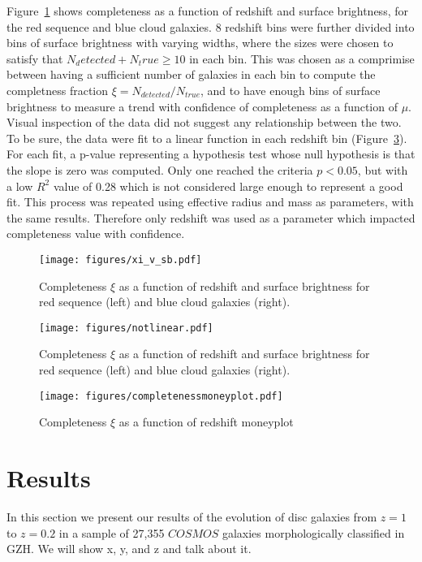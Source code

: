 Figure~\ref{fig:xi_v_sb} shows completeness as a function of redshift and surface brightness, for the red sequence and blue cloud galaxies. 8 redshift bins were further divided into bins of surface brightness with varying widths, where the sizes were chosen to satisfy that $N_detected + N_true \ge 10$ in each bin. This was chosen as a comprimise between having a sufficient number of galaxies in each bin to compute the completness fraction $\xi = N_{detected}/N_{true}$, and to have enough bins of surface brightness to measure a trend with confidence of completeness as a function of $\mu$. Visual inspection of the data did not suggest any relationship between the two. To be sure, the data were fit to a linear function in each redshift bin (Figure~\ref{fig:notlinear}). For each fit, a p-value representing a hypothesis test whose null hypothesis is that the slope is zero was computed. Only one reached the criteria $p<0.05$, but with a low $R^{2}$ value of 0.28 which is not considered large enough to represent a good fit. This process was repeated using effective radius and mass as parameters, with the same results. Therefore only redshift was used as a parameter which impacted completeness value with confidence.  


\begin{figure}
\centering
\texttt{[image: figures/xi\_v\_sb.pdf]}
\caption{Completeness $\xi$ as a function of redshift and surface brightness for red sequence (left) and blue cloud galaxies (right).}
\label{fig:xi_v_sb}
\end{figure}

\begin{figure}
\centering
\texttt{[image: figures/notlinear.pdf]}
\caption{Completeness $\xi$ as a function of redshift and surface brightness for red sequence (left) and blue cloud galaxies (right).}
\label{fig:notlinear}
\end{figure}


\begin{figure}
\centering
\texttt{[image: figures/completenessmoneyplot.pdf]}
\caption{Completeness $\xi$ as a function of redshift moneyplot}
\label{fig:notlinear}
\end{figure}

\section{Results}
\label{sec:results}
In this section we present our results of the evolution of disc galaxies from $z=1$ to $z=0.2$ in a sample of 27,355 $COSMOS$ galaxies morphologically classified in GZH. We will show x, y, and z and talk about it. 

